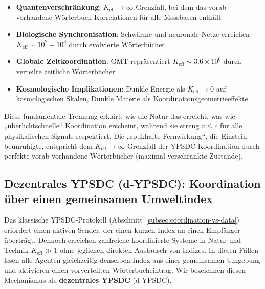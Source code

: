 \documentclass[11pt,a4paper]{article}
\begin{document}
	\begin{itemize}
		\item \textbf{Quantenverschränkung}: $K_{\mathrm{eff}} \to \infty$ Grenzfall, bei dem das vorab vorhandene Wörterbuch Korrelationen für alle Messbasen enthält
		
		\item \textbf{Biologische Synchronisation}: Schwärme und neuronale Netze erreichen $K_{\mathrm{eff}} \sim 10^2-10^3$ durch evolvierte Wörterbücher
		
		\item \textbf{Globale Zeitkoordination}: GMT repräsentiert $K_{\mathrm{eff}} \sim 3.6\times10^6$ durch verteilte zeitliche Wörterbücher
		
		\item \textbf{Kosmologische Implikationen}: Dunkle Energie als $K_{\mathrm{eff}} \to 0$ auf kosmologischen Skalen, Dunkle Materie als Koordinationsgeometrieeffekte
	\end{itemize}
	
	Diese fundamentale Trennung erklärt, wie die Natur das erreicht, was wie „überlichtschnelle“ Koordination erscheint, während sie streng $v \leq c$ für alle physikalischen Signale respektiert. Die „spukhafte Fernwirkung“, die Einstein beunruhigte, entspricht dem $K_{\mathrm{eff}} \to \infty$ Grenzfall der YPSDC-Koordination durch perfekte vorab vorhandene Wörterbücher (maximal verschränkte Zustände).
	
	\subsection{Dezentrales YPSDC (d‑YPSDC): Koordination über einen gemeinsamen Umweltindex}
	\label{subsec:d-ypsdc}
	
	Das klassische YPSDC-Protokoll (Abschnitt~\ref{subsec:coordination-vs-data}) erfordert einen aktiven Sender,
	der einen kurzen Index an einen Empfänger überträgt. Dennoch erreichen zahlreiche koordinierte Systeme in Natur und Technik
	$K_{\mathrm{eff}} \gg 1$ ohne jeglichen direkten Austausch von Indizes. In diesen Fällen lesen alle Agenten
	gleichzeitig denselben Index aus einer gemeinsamen Umgebung und aktivieren einen vorverteilten Wörterbucheintrag.
	Wir bezeichnen diesen Mechanismus als \textbf{dezentrales YPSDC} (d‑YPSDC).
	
\end{document}
